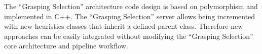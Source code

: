 \begin{figure}[h!]
\end{figure}

The ``Grasping Selection'' architecture code design is based on polymorphism and implemented in C++. The ``Grasping Selection'' server allows being incremented with new heuristics classes that inherit a defined parent class. Therefore new approaches can be easily integrated without modifying the ``Grasping Selection'' core architecture and pipeline workflow.  

